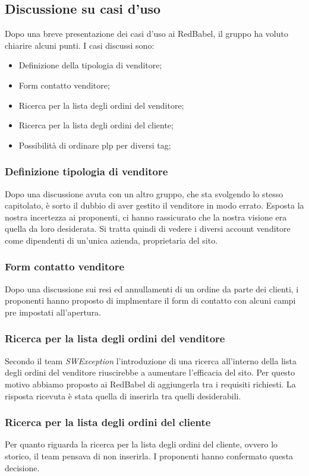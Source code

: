 \subsection{Discussione su casi d'uso}
Dopo una breve presentazione dei casi d'uso ai RedBabel, il gruppo ha voluto chiarire alcuni punti.
I casi discussi sono:
\begin{itemize}
	\item Definizione della tipologia di venditore;
	\item Form contatto venditore;
	\item Ricerca per la lista degli ordini del venditore;
	\item Ricerca per la lista degli ordini del cliente;
	\item Possibilità di ordinare plp per diversi tag;
\end{itemize}

\subsubsection{Definizione tipologia di venditore}
Dopo una discussione avuta con un altro gruppo, che sta svolgendo lo stesso capitolato, è sorto il dubbio di aver gestito il venditore in modo errato.
Esposta la nostra incertezza ai proponenti, ci hanno rassicurato che la nostra visione era quella da loro desiderata.
Si tratta quindi di vedere i diversi account venditore come dipendenti di un'unica azienda, proprietaria del sito.

\subsubsection{Form contatto venditore}
Dopo una discussione sui resi ed annullamenti di un ordine da parte dei clienti, i proponenti hanno proposto di implmentare il form di contatto con alcuni campi pre impostati all'apertura.

\subsubsection{Ricerca per la lista degli ordini del venditore}
Secondo il team \textit{SWException} l'introduzione di una ricerca all'interno della lista degli ordini del venditore riuscirebbe a aumentare l'efficacia del sito.
Per questo motivo abbiamo proposto ai RedBabel di aggiungerla tra i requisiti richiesti. La risposta ricevuta è stata quella di inserirla tra quelli desiderabili.

\subsubsection{Ricerca per la lista degli ordini del cliente}
Per quanto riguarda la ricerca per la lista degli ordini del cliente, ovvero lo storico, il team pensava di non inserirla. I proponenti hanno confermato questa decisione.

